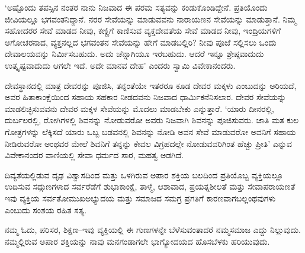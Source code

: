 ‘ಅಷ್ಟೊಂದು ತಪಸ್ಸಿನ ನಂತರ ನಾನು ನಿಜವಾದ ಈ ಪರಮ ಸತ್ಯವನ್ನು ಕಂಡುಕೊಂಡಿದ್ದೇನೆ. ಪ್ರತಿಯೊಂದು ಜೀವಿಯಲ್ಲೂ ಭಗವಂತನಿದ್ದಾನೆ. ನರರ ಸೇವೆಯನ್ನು ಮಾಡುವವನು ನಾರಾಯಣನ ಸೇವೆಯನ್ನು ಮಾಡುತ್ತಾನೆ. ನಿಮ್ಮ ಸಹೋದರರ ಸೇವೆ ಮಾಡದ ನೀವು, ಕಣ್ಣಿಗೆ ಕಾಣಿಸುವ ವ್ಯಕ್ತದೇವತೆಯ ಸೇವೆ ಮಾಡದ ನೀವು, ಇಂದ್ರಿಯಗಳಿಗೆ ಅಗೋಚರನಾದ, ವ್ಯಕ್ತನಲ್ಲದ ಭಗವಂತನ ಸೇವೆಯನ್ನು ಹೇಗೆ ಮಾಡಬಲ್ಲಿರಿ? ನೀವು ಪೂಜೆ ಸಲ್ಲಿಸಲು ಒಂದು ದೇವಾಲಯವನ್ನು ನಿರ್ಮಿಸಬಹುದು. ಅದು ಚೆನ್ನಾಗಿಯೂ ಇರಬಹುದು. ಆದರೆ ಇನ್ನೂ ಶ್ರೇಷ್ಠವಾದುದು ಉತ್ಕೃಷ್ಟವಾದುದು ಆಗಲೇ ಇದೆ. ಅದೇ ಮಾನವ ದೇಹ’ ಎಂದರು ಸ್ವಾಮಿ ವಿವೇಕಾನಂದರು.

ದೇವಸ್ಥಾನದಲ್ಲಿ ಮಾತ್ರ ದೇವರನ್ನು ಪೂಜಿಸಿ, ತನ್ನಂತೆಯೇ ಇತರರೂ ಕೂಡ ದೇವರ ಮಕ್ಕಳು ಎಂಬುದನ್ನು ಅರಿಯದೆ, ಅವರ ಹಿತಾಕಾಂಕ್ಷೆಯಿಂದ ಸಹಾಯ ಸಹಕಾರ ನೀಡದವನು ನಿಜವಾದ ಧಾರ್ಮಿಕನೆನಿಸಲಾರ. ದೇವರ ಸೇವೆಯನ್ನು ಮಾಡಲಿಚ್ಛಿಸುವವನು ದೇವರ ಮಕ್ಕಳ ಸೇವೆಯನ್ನು ಮೊದಲು ಮಾಡಬೇಕು ಎನ್ನುತ್ತಾರೆ. ‘ಯಾರು ದೀನರಲ್ಲಿ, ದುರ್ಬಲರಲ್ಲಿ, ರೋಗಿಗಳಲ್ಲಿ ಶಿವನನ್ನು ನೋಡುವರೋ ಅವರು ನಿಜವಾಗಿ ಶಿವನನ್ನು ಪೂಜಿಸುವರು. ಜಾತಿ ಮತ ಕುಲ ಗೋತ್ರಗಳನ್ನು ಲೆಕ್ಕಿಸದೆ ಯಾರು ಒಬ್ಬ ಬಡವನಲ್ಲಿ ಶಿವನನ್ನು ನೋಡಿ ಅವನ ಸೇವೆ ಮಾಡುವರೋ ಅವನಿಗೆ ಸಹಾಯ ನೀಡಿರುವರೋ ಅಂಥವರ ಮೇಲೆ ಶಿವನಿಗೆ ತನ್ನನ್ನು ಕೇವಲ ವಿಗ್ರಹದಲ್ಲೇ ನೋಡುವವರಿಗಿಂತ ಹೆಚ್ಚು ಪ್ರೀತಿ’ ಎನ್ನುವ ವಿವೇಕಾನಂದರ ವಾಣಿಯಲ್ಲಿ ಸೇವಾ ಧರ್ಮದ ಸಾರ, ಮಹತ್ವ ಅಡಗಿದೆ.

ದಿವ್ಯತೆಯಲ್ಲಿಡುವ ದೃಢ ವಿಶ್ವಾಸದಿಂದ ಮತ್ತು ಒಳಗಿರುವ ಅಪಾರ ಶಕ್ತಿಯ ಬಲದಿಂದ ಪ್ರತಿಯೊಬ್ಬ ವ್ಯಕ್ತಿಯಲ್ಲೂ ಉದಿಸುವ ಸದ್ಗುಣಗಳಾದ ಸರ್ವರೆಡೆಗೆ ಶುಭಾಕಾಂಕ್ಷೆ, ತಾಳ್ಮೆ, ಆಶಾವಾದ, ಪ್ರಯತ್ನಶೀಲತೆ ಮತ್ತು ಸೇವಾಪರಾಯಣತೆ ಇವು ವ್ಯಕ್ತಿಯ ಸರ್ವತೋಮುಖ\break ಅಭ್ಯುದಯ ಮತ್ತು ಸಮಾಜದ ಸಮಗ್ರ ಪ್ರಗತಿಗೆ ಕಾರಣವಾಗಬಲ್ಲಂಥವುಗಳು ಎಂಬುದು ಸಂಶಯ ರಹಿತ ಸತ್ಯ.

ನಮ್ಮ ಓದು, ಪರಿಸರ, ಶಿಕ್ಷಣ–ಇವು ವ್ಯಕ್ತಿಯಲ್ಲಿ ಈ ಗುಣಗಳನ್ನೇ ಬೆಳೆಸುವಂತಾದರೆ ನಮ್ಮಸಮಾಜ ಎದ್ದು ನಿಲ್ಲುವುದು. ನಮ್ಮಲ್ಲಿರುವ ಅಪಾರ ಶಕ್ತಿಯನ್ನು ನಾವು ಮನಗಂಡಾಗಲೇ ಭಾಗ್ಯೋದಯದ ಹೊಸಬೆಳಕು ಹರಿಯುವುದು.

\chapterend


